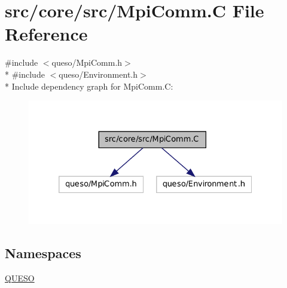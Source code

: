 \hypertarget{_mpi_comm_8_c}{\section{src/core/src/\-Mpi\-Comm.C File Reference}
\label{_mpi_comm_8_c}
}
{\ttfamily \#include $<$queso/\-Mpi\-Comm.\-h$>$}\\*
{\ttfamily \#include $<$queso/\-Environment.\-h$>$}\\*
Include dependency graph for Mpi\-Comm.\-C\-:
\nopagebreak
\begin{figure}[H]
\begin{center}
\leavevmode
\includegraphics[width=328pt]{_mpi_comm_8_c__incl}
\end{center}
\end{figure}
\subsection*{Namespaces}
\begin{DoxyCompactItemize}
\item 
\hyperlink{namespace_q_u_e_s_o}{Q\-U\-E\-S\-O}
\end{DoxyCompactItemize}
